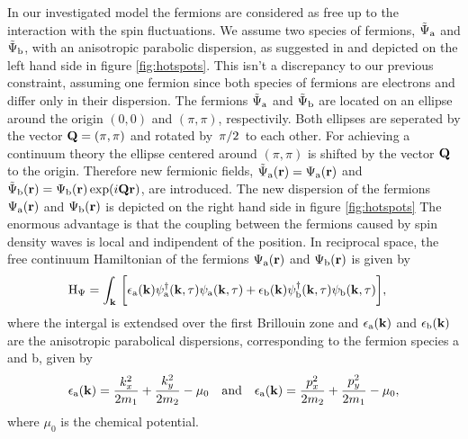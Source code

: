 In our investigated model the fermions are considered as free up to the interaction with the spin fluctuations.
We assume two species of fermions, $\tilde{\Psi}_{\mathrm{a}}$ and $\tilde{\Psi}_{\mathrm{b}}$, with an anisotropic parabolic dispersion, as suggested in \cite{Patel&Sachdev} and depicted on the left hand side in figure \ref{fig:hotspots}.
This isn't a discrepancy to our previous constraint, assuming one fermion since both species of fermions are electrons and differ only in their dispersion.
The fermions $\tilde{\Psi}_{\mathrm{a}}$ and $\tilde{\Psi}_{\mathrm{b}}$ are located on an ellipse around the origin $(0,0)$ and $(\pi,\pi)$, respectivily.
Both ellipses are seperated by the vector $\vb{Q} = (\pi,\pi)$ and rotated by $\flatfrac{\pi}{2}$ to each other.
For achieving a continuum theory the ellipse centered around $(\pi,\pi)$ is shifted by the vector $\vb{Q}$ to the origin.
Therefore new fermionic fields, $\tilde{\Psi}_{\mathrm{a}}(\vb{r}) = \Psi_{\mathrm{a}}(\vb{r})$ and $\tilde{\Psi}_{\mathrm{b}}(\vb{r}) = \Psi_{\mathrm{b}}(\vb{r}) \exp(i\vb{Q}\vb{r})$, are introduced.
The new dispersion of the fermions $\Psi_{\mathrm{a}}(\vb{r})$ and $\Psi_{\mathrm{b}}(\vb{r})$ is depicted on the right hand side in figure \ref{fig:hotspots}
The enormous advantage is that the coupling between the fermions caused by spin density waves is local and indipendent of the position.
In reciprocal space, the free continuum Hamiltonian of the fermions $\Psi_{\mathrm{a}}(\vb{r})$ and $\Psi_{\mathrm{b}}(\vb{r})$ is given by
%
\begin{align}
	\mathrm{H}_{\Psi} &= 
	 	\int_{\vb{k}}\,
	 	\bigg[
	 		\epsilon_{\mathrm{a}}(\vb{k})
	 		\psi_{\mathrm{a}}^{\dag}(\vb{k},\tau)
	 		\psi_{\mathrm{a}}(\vb{k},\tau)
	 		+
	 		\epsilon_{\mathrm{b}}(\vb{k})
	 		\psi_{\mathrm{b}}^{\dag}(\vb{k},\tau)
	 		\psi_{\mathrm{b}}(\vb{k},\tau)
	 	\bigg],
	 \label{eq:Hamiltonian electrons}
\end{align}
%
where the intergal is extendsed over the first Brillouin zone and $\epsilon_{\mathrm{a}}(\vb{k})$ and $\epsilon_{\mathrm{b}}(\vb{k})$ are the anisotropic parabolical dispersions, corresponding to the fermion species a and b, given by
%
\begin{align}
	\epsilon_{\mt{a}}(\vb{k}) = \frac{k_{x}^{2}}{2m_{1}} + \frac{k_{y}^{2}}{2m_{2}} - \mu_{0}
	\qq{and}
	\epsilon_{\mt{a}}(\vb{k}) = \frac{p_{x}^{2}}{2m_{2}} + \frac{p_{y}^{2}}{2m_{1}} - \mu_{0},
	\label{eq:dispersion relations}
\end{align}
%
where $\mu_{0}$ is the chemical potential.
%
%
